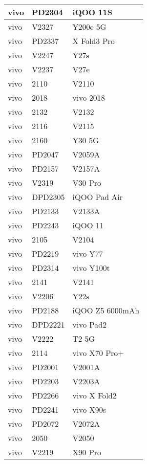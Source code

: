 \begin{tabularx}{\linewidth}{|l|X|X|}
        vivo & PD2304 & iQOO 11S \\ \hline
        vivo & V2327 & Y200e 5G \\ \hline
        vivo & PD2337 & X Fold3 Pro \\ \hline
        vivo & V2247 & Y27s \\ \hline
        vivo & V2237 & V27e \\ \hline
        vivo & 2110 & V2110 \\ \hline
        vivo & 2018 & vivo 2018 \\ \hline
        vivo & 2132 & V2132 \\ \hline
        vivo & 2116 & V2115 \\ \hline
        vivo & 2160 & Y30 5G \\ \hline
        vivo & PD2047 & V2059A \\ \hline
        vivo & PD2157 & V2157A \\ \hline
        vivo & V2319 & V30 Pro \\ \hline
        vivo & DPD2305 & iQOO Pad Air \\ \hline
        vivo & PD2133 & V2133A \\ \hline
        vivo & PD2243 & iQOO 11 \\ \hline
        vivo & 2105 & V2104 \\ \hline
        vivo & PD2219 & vivo Y77 \\ \hline
        vivo & PD2314 & vivo Y100t \\ \hline
        vivo & 2141 & V2141 \\ \hline
        vivo & V2206 & Y22s \\ \hline
        vivo & PD2188 & iQOO Z5 6000mAh \\ \hline
        vivo & DPD2221 & vivo Pad2 \\ \hline
        vivo & V2222 & T2 5G \\ \hline
        vivo & 2114 & vivo X70 Pro+ \\ \hline
        vivo & PD2001 & V2001A \\ \hline
        vivo & PD2203 & V2203A \\ \hline
        vivo & PD2266 & vivo X Fold2 \\ \hline
        vivo & PD2241 & vivo X90s \\ \hline
        vivo & PD2072 & V2072A \\ \hline
        vivo & 2050 & V2050 \\ \hline
        vivo & V2219 & X90 Pro \\ \hline

\end{tabularx}
